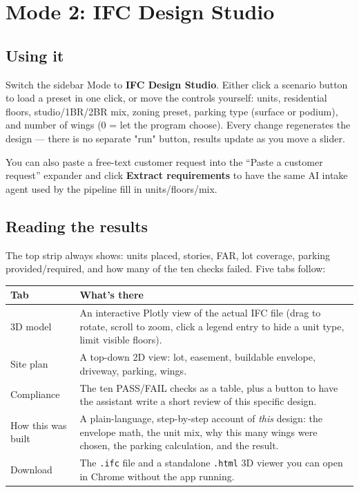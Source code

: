 \documentclass[11pt]{article}
\begin{document}
\section{Mode 2: IFC Design Studio}
\subsection{Using it}
Switch the sidebar Mode to \textbf{IFC Design Studio}. Either click a scenario button to load a preset in one
click, or move the controls yourself: units, residential floors, studio/1BR/2BR mix, zoning preset, parking type
(surface or podium), and number of wings (0 = let the program choose). Every change regenerates the design —
there is no separate "run" button, results update as you move a slider.

You can also paste a free-text customer request into the ``Paste a customer request'' expander and click
\textbf{Extract requirements} to have the same AI intake agent used by the pipeline fill in units/floors/mix.

\subsection{Reading the results}
The top strip always shows: units placed, stories, FAR, lot coverage, parking provided/required, and how many of
the ten checks failed. Five tabs follow:
\begin{table}[H]\centering\small
\begin{tabular}{@{}lp{10cm}@{}}\toprule
Tab & What's there \\ \midrule
3D model & An interactive Plotly view of the actual IFC file (drag to rotate, scroll to zoom, click a legend entry to hide a unit type, limit visible floors). \\
Site plan & A top-down 2D view: lot, easement, buildable envelope, driveway, parking, wings. \\
Compliance & The ten PASS/FAIL checks as a table, plus a button to have the assistant write a short review of this specific design. \\
How this was built & A plain-language, step-by-step account of \emph{this} design: the envelope math, the unit mix, why this many wings were chosen, the parking calculation, and the result. \\
Download & The \texttt{.ifc} file and a standalone \texttt{.html} 3D viewer you can open in Chrome without the app running. \\ \bottomrule
\end{tabular}\end{table}
\end{document}

